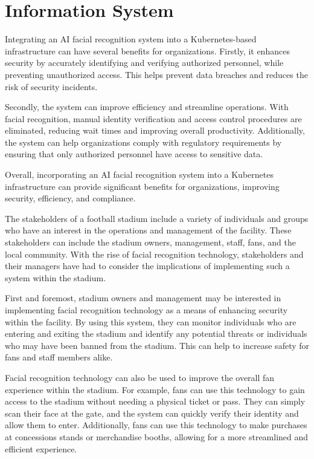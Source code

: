 \section{Information System}
Integrating an AI facial recognition system into a Kubernetes-based infrastructure can have several benefits for organizations. Firstly, it enhances security by accurately identifying and verifying authorized personnel, while preventing unauthorized access. This helps prevent data breaches and reduces the risk of security incidents.

Secondly, the system can improve efficiency and streamline operations. With facial recognition, manual identity verification and access control procedures are eliminated, reducing wait times and improving overall productivity. Additionally, the system can help organizations comply with regulatory requirements by ensuring that only authorized personnel have access to sensitive data.

Overall, incorporating an AI facial recognition system into a Kubernetes infrastructure can provide significant benefits for organizations, improving security, efficiency, and compliance.

The stakeholders of a football stadium include a variety of individuals and groups who have an interest in the operations and management of the facility. These stakeholders can include the stadium owners, management, staff, fans, and the local community. With the rise of facial recognition technology, stakeholders and their managers have had to consider the implications of implementing such a system within the stadium.

First and foremost, stadium owners and management may be interested in implementing facial recognition technology as a means of enhancing security within the facility. By using this system, they can monitor individuals who are entering and exiting the stadium and identify any potential threats or individuals who may have been banned from the stadium. This can help to increase safety for fans and staff members alike.

Facial recognition technology can also be used to improve the overall fan experience within the stadium. For example, fans can use this technology to gain access to the stadium without needing a physical ticket or pass. They can simply scan their face at the gate, and the system can quickly verify their identity and allow them to enter. Additionally, fans can use this technology to make purchases at concessions stands or merchandise booths, allowing for a more streamlined and efficient experience.

